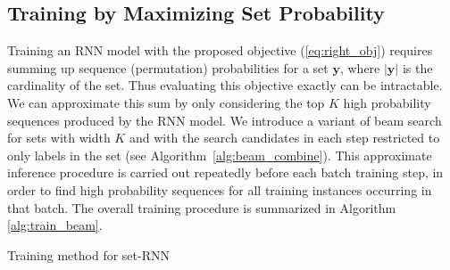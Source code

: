 \subsection{Training by Maximizing Set Probability}
Training an RNN model with the proposed objective (\ref{eq:right_obj}) requires summing up sequence (permutation) probabilities for a set $\mathbf{y}$, where $|\mathbf{y}|$ is the cardinality of the set. Thus evaluating this objective exactly can be intractable. We can approximate this sum by only considering the top $K$ high probability sequences produced by the RNN model. We introduce a variant of beam search for sets with width $K$ and with the search candidates in each step restricted to only labels in the set (see Algorithm~\ref{alg:beam_combine}). This approximate inference procedure is carried out repeatedly before each batch training step, in order to find high probability sequences for all training instances occurring in that batch. The overall training procedure is summarized in Algorithm \ref{alg:train_beam}.%

\begin{algorithm}

    
    \caption{Training method for set-RNN}
    \label{alg:train_beam}
\end{algorithm}


